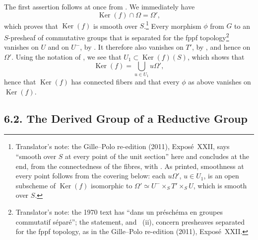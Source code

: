 The first assertion follows at once from . We immediately
have
\[
  \operatorname{Ker}(f)\cap\Omega=\Omega',
\]
which proves that \(\operatorname{Ker}(f)\) is smooth over \(S\).\footnote{Translator's note: the Gille--Polo re-edition (2011), Exposé~XXII, says
``smooth over \(S\) at every point of the unit section'' here and concludes
at the end, from the connectedness of the fibres, with
. As printed, smoothness at every point follows from the
covering below: each \(u\Omega'\), \(u\in U_1\), is an open subscheme of
\(\operatorname{Ker}(f)\) isomorphic to
\(\Omega'\simeq U^-\times_S T'\times_S U\), which is smooth over \(S\).}
Every morphism \(\phi\) from \(G\) to an \(S\)-presheaf of
commutative groups that is separated for the fppf
topology\footnote{Translator's note: the 1970 text has ``dans un préschéma en
groupes commutatif séparé''; the statement, and ~(ii), concern
presheaves separated for the fppf topology, as in the Gille--Polo re-edition
(2011), Exposé~XXII.} vanishes on \(U\) and on \(U^-\), by \textup{}. It therefore also
vanishes on \(T'\), by , and hence on \(\Omega'\). Using the
notation of , we see that
\(U_1\subset\operatorname{Ker}(f)(S)\), which shows that
\[
  \operatorname{Ker}(f)
  =
  \bigcup_{u\in U_1}u\Omega',
\]
hence that \(\operatorname{Ker}(f)\) has connected fibers and that
every \(\phi\) as above vanishes on \(\operatorname{Ker}(f)\).

\subsection*{6.2. The Derived Group of a Reductive Group}

